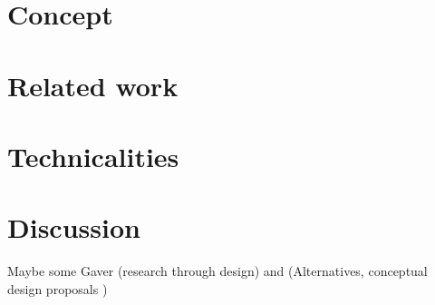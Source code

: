 \section{Concept}
\section{Related work}
\section{Technicalities}
\section{Discussion}
Maybe some Gaver (research through design) and (Alternatives, conceptual design proposals )